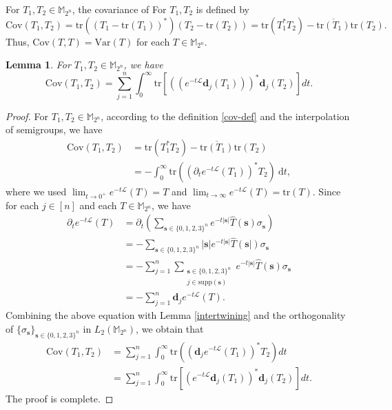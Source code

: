 \documentclass{amsbook}
\newtheorem{lemma}[theorem]{Lemma}
\theoremstyle{definition}
\theoremstyle{remark}
\numberwithin{section}{chapter}
\numberwithin{equation}{chapter}
\newcommand{\M}{\mathbb{M}}
\newcommand{\1}{\mathbf{1}}
\newcommand{\s}{\mathbf{s}}
\newcommand{\tr}{\mathrm{tr}}
\newcommand{\dc}{\mathbf{d}}
\begin{document}
For $T_1,T_2\in\mathbb{M}_{2^n}$, the covariance of For $T_1,T_2$ is defined by
\begin{equation}\label{cov-def}
\mathrm{Cov}(T_1,T_2)=\mathrm{tr}((T_1-\mathrm{tr}(T_1))^*)(T_2-\mathrm{tr}(T_2))=\mathrm{tr}(T_1^*T_2)-\overline{\mathrm{tr}(T_1)}\mathrm{tr}(T_2).
\end{equation}
Thus, $\mathrm{Cov}(T,T)=\mathrm{Var}(T)$ for each $T\in \M_{2^{n}}$.
\begin{lemma}\label{cov-semigroup-0-infty}
For $T_1,T_2\in\mathbb{M}_{2^n}$, we have
$$\mathrm{Cov}(T_1,T_2)=\sum_{j=1}^n\int_{0}^\infty\mathrm{tr}[((e^{-t\mathcal{L}}\dc_{j}(T_1)))^*\dc_{j}(T_2)]dt.$$
\end{lemma}
\begin{proof} For $T_1,T_2\in\mathbb{M}_{2^n}$, according to the definition \eqref{cov-def}  and  the interpolation of semigroups, we have
\begin{equation}\label{cov-1}
\begin{aligned}
\mathrm{Cov}(T_1,T_2)&=\mathrm{tr}(T_1^*T_2)-\overline{\mathrm{tr}(T_1)}\mathrm{tr}(T_2)\\
&=-\int_{0}^\infty\mathrm{tr}((\partial_te^{-t\mathcal{L}}(T_1))^*T_2)~\mathrm{d}t,
\end{aligned}
\end{equation}
where we used $\lim_{t\to 0^{+}}e^{-t\mathcal{L}}(T)=T$ and $\lim_{t\to \infty}e^{-t\mathcal{L}}(T)=\tr(T)$.
Since for each $j\in[n]$ and  each $T\in\mathbb{M}_{2^n}$, we have
\begin{align*}
\partial_te^{-t\mathcal{L}}(T)&=\partial_t\left(\sum_{\mathbf{s}\in\{0,1,2,3\}^n}e^{-t|\mathbf{s}|}\widehat{T}(\mathbf{s})\sigma_\mathbf{s}\right)\\
&=-\sum_{\mathbf{s}\in\{0,1,2,3\}^n}|\mathbf{s}|e^{-t|\mathbf{s}|}\widehat{T}(\mathbf{s}|)\sigma_\mathbf{s}\\
&=-\sum_{j=1}^n\sum_{\substack{\mathbf{s}\in\{0,1,2,3\}^n\\j\in\mathrm{supp}(\mathbf{s})}}e^{-t|\mathbf{s}|}\widehat{T}(\mathbf{s})\sigma_\mathbf{s}\\
&=-\sum_{j=1}^n\dc_{j}e^{-t\mathcal{L}}(T).
\end{align*}
Combining the above equation with Lemma \ref{intertwining} and  the orthogonality of $\{\sigma_{\s}\}_{\s\in\{0,1,2,3\}^{n}}$ in $L_{2}(\M_{2^{n}})$, we obtain that
\begin{align*}
\mathrm{Cov}(T_1,T_2)&=\sum_{j=1}^n\int_{0}^\infty\mathrm{tr}((\dc_{j}e^{-t\mathcal{L}}(T_1))^*T_2)dt\\
&=\sum_{j=1}^n\int_{0}^\infty\mathrm{tr}[(e^{-t\mathcal{L}}\dc_{j}(T_1))^*\dc_{j}(T_2)]dt.
\end{align*}
The proof is complete.
\end{proof}
\end{document}
